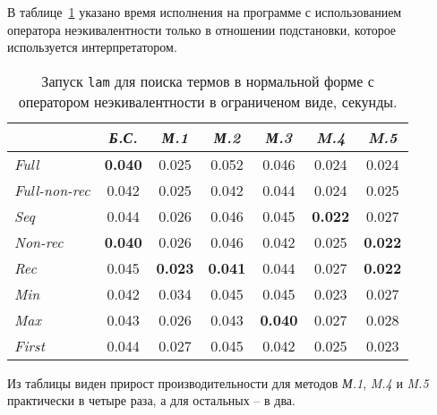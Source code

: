 В таблице~\ref{fig:lamTestDiseqSimple} указано время исполнения на программе с
использованием оператора неэкивалентности только в отношении подстановки, которое
используется интерпретатором.

\begin{table}[h!]
\center
\begin{tabular}{|l|c|c|c|c|c|c|}
\hline
   &{\it Б.С.}&{\it М.1}&{\it М.2}&{\it М.3}&{\it M.4}&{\it M.5} \\ \hline

{\it Full        } & {\bf 0.040} &  0.025    & 0.052     &0.046      & 0.024     & 0.024 \\ \hline
{\it Full-non-rec} & 0.042       &  0.025    & 0.042     &0.044      & 0.024     & 0.025 \\ \hline
{\it Seq         } & 0.044       &  0.026    & 0.046     &0.045      &{\bf 0.022}& 0.027 \\ \hline
{\it Non-rec     } & {\bf 0.040} &  0.026    & 0.046     &0.042      & 0.025     &{\bf 0.022} \\ \hline
{\it Rec         } & 0.045       &{\bf 0.023}&{\bf 0.041}&0.044      & 0.027     &{\bf 0.022} \\ \hline
{\it Min         } & 0.042       &  0.034    & 0.045     &0.045      & 0.023     & 0.027 \\ \hline
{\it Max         } & 0.043       &  0.026    & 0.043     &{\bf 0.040}& 0.027     & 0.028 \\ \hline
{\it First       } & 0.044       &  0.027    & 0.045     &0.042      & 0.025     & 0.023 \\ \hline
\end{tabular}
\caption{Запуск \lstinline{lam} для поиска термов в нормальной форме с оператором неэкивалентности в ограниченом виде, секунды.}
\label{fig:lamTestDiseqSimple}
\end{table}

Из таблицы виден прирост производительности для методов {\it М.1}, {\it M.4} и
{\it M.5} практически в четыре раза, а для остальных -- в два. \\


